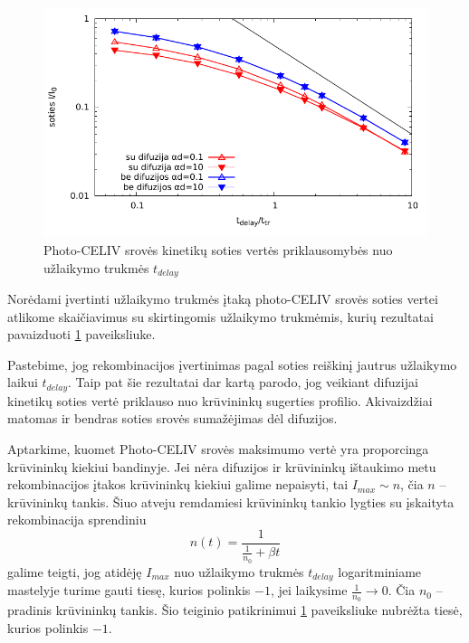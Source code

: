 \begin{figure}[H]
  \centering
	\includegraphics{./media/pdf/delays.pdf}
  \caption{Photo-CELIV srovės kinetikų soties vertės priklausomybės nuo užlaikymo trukmės $t_{delay}$}
  \label{fig:delays}
\end{figure}

Norėdami įvertinti užlaikymo trukmės įtaką photo-CELIV srovės soties vertei atlikome skaičiavimus su skirtingomis užlaikymo trukmėmis, kurių rezultatai pavaizduoti \ref{fig:delays} paveiksliuke.

Pastebime, jog rekombinacijos įvertinimas pagal soties reiškinį jautrus užlaikymo laikui $t_{delay}$. Taip pat šie rezultatai dar kartą parodo, jog veikiant difuzijai kinetikų soties vertė priklauso nuo krūvininkų sugerties profilio. Akivaizdžiai matomas ir bendras soties srovės sumažėjimas dėl difuzijos.

Aptarkime, kuomet Photo-CELIV srovės maksimumo vertė yra proporcinga krūvininkų kiekiui bandinyje. Jei nėra difuzijos ir krūvininkų ištaukimo metu rekombinacijos įtakos krūvininkų kiekiui galime nepaisyti, tai $I_{max} \sim n$, čia $n$ -- krūvininkų tankis. Šiuo atveju remdamiesi krūvininkų tankio lygties su įskaityta rekombinacija sprendiniu $$ n(t) = \frac{1}{\frac{1}{n_0} + \beta t} $$ galime teigti, jog atidėję $I_{max}$ nuo užlaikymo trukmės $t_{delay}$ logaritminiame mastelyje turime gauti tiesę, kurios polinkis $-1$, jei laikysime $\frac{1}{n_0} \rightarrow 0$. Čia $n_0$ -- pradinis krūvininkų tankis.
Šio teiginio patikrinimui \ref{fig:delays} paveiksliuke nubrėžta tiesė, kurios polinkis $-1$.

